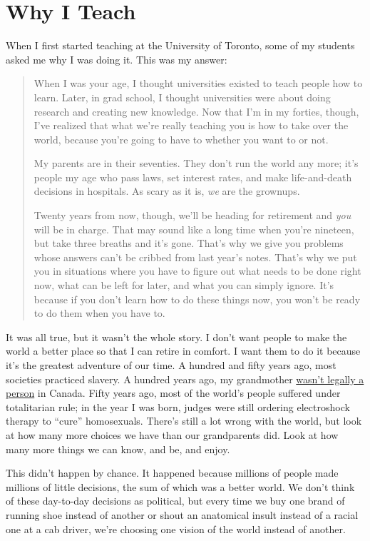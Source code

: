 \chapter{Why I Teach}\label{s:finale}

When I first started teaching at the University of Toronto, some of my
students asked me why I was doing it. This was my answer:

\begin{quote}\setlength{\parindent}{0pt}
When I was your age, I thought universities existed to teach people
how to learn. Later, in grad school, I thought universities were about
doing research and creating new knowledge. Now that I'm in my forties,
though, I've realized that what we're really teaching you is how to
take over the world, because you're going to have to whether you want
to or not.

My parents are in their seventies. They don't run the world any more;
it's people my age who pass laws, set interest rates, and make
life-and-death decisions in hospitals. As scary as it is, \emph{we} are the
grownups.

Twenty years from now, though, we'll be heading for retirement and
\emph{you} will be in charge. That may sound like a long time when you're
nineteen, but take three breaths and it's gone. That's why we give you
problems whose answers can't be cribbed from last year's notes. That's
why we put you in situations where you have to figure out what needs
to be done right now, what can be left for later, and what you can
simply ignore. It's because if you don't learn how to do these things
now, you won't be ready to do them when you have to.
\end{quote}

It was all true, but it wasn't the whole story. I don't want people to
make the world a better place so that I can retire in comfort. I want
them to do it because it's the greatest adventure of our time. A
hundred and fifty years ago, most societies practiced slavery. A
hundred years ago, my grandmother \href{https://en.wikipedia.org/wiki/The_Famous_Five_(Canada)}{wasn't legally a
person} in Canada. Fifty years ago, most of the world's
people suffered under totalitarian rule; in the year I was born,
judges were still ordering electroshock therapy to ``cure''
homosexuals. There's still a lot wrong with the world, but look at how
many more choices we have than our grandparents did. Look at how many
more things we can know, and be, and enjoy.

This didn't happen by chance. It happened because millions of people
made millions of little decisions, the sum of which was a better world.
We don't think of these day-to-day decisions as political, but every
time we buy one brand of running shoe instead of another or shout an
anatomical insult instead of a racial one at a cab driver, we're
choosing one vision of the world instead of another.

